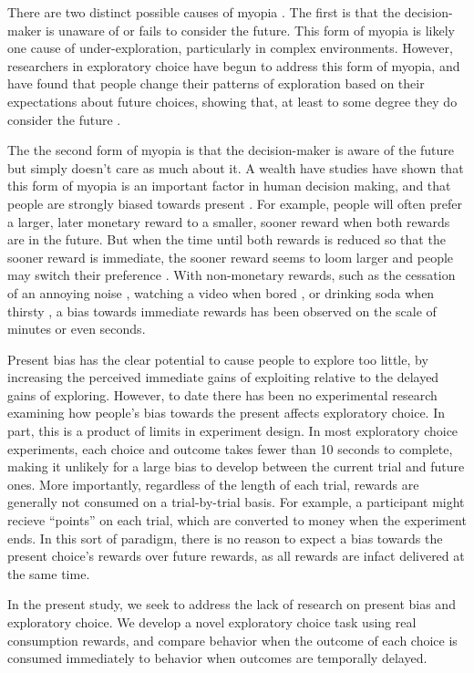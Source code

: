 \documentclass[10pt,letterpaper]{article}
\begin{document}
There are two distinct possible causes of myopia \citep{Bartels2015}. The first is that the decision-maker is
unaware of or fails to consider the future. This form of myopia is likely one
cause of under-exploration, particularly in complex environments. However,
researchers in exploratory choice have begun to address this form of myopia, and
have found that people change their
patterns of exploration based on their expectations about future choices,
showing that, at least to some degree they do consider the future \citep{Meyer1995, Wilson2014a, Rich2017}.

The the second form of myopia is that the decision-maker
is aware of the future but simply doesn't care as much about it.
A wealth have studies have shown that this form of myopia is an important factor
in human decision making, and that people are strongly
biased towards present . For example, people will often prefer a larger, later monetary
reward to a smaller, sooner reward when both rewards are in the future. But when the
time until both rewards is reduced so that the sooner reward is immediate, the
sooner reward seems to loom larger and
people may switch their preference \citep{Kirby1995}. With non-monetary rewards,
such as the cessation of an annoying noise \citep{Solnick1980}, watching a video
when bored \citep{Navarick1998}, or drinking soda
when thirsty \citep{Brown2009}, a bias towards immediate rewards has been observed on the scale of
minutes or even seconds.

Present bias has the clear potential to cause people to explore too little, by
increasing the perceived immediate gains of exploiting relative to the delayed
gains of exploring. However, to date there has been no experimental research
examining how people's bias towards the present affects exploratory choice. In
part, this is a product of limits in experiment design. In most exploratory
choice experiments, each choice and outcome takes fewer than 10 seconds to
complete, making it unlikely for a large bias to develop between the current
trial and future ones. More importantly, regardless of the length of each trial,
rewards are generally not consumed on a trial-by-trial basis. For example, a participant
might recieve ``points'' on each trial, which are converted to money when the
experiment ends. In this sort of paradigm, there is no reason to expect a bias
towards the present choice's rewards over future rewards, as all rewards are
infact delivered at the same time.

In the present study, we seek to address the lack of research on present bias
and exploratory choice. We develop a novel exploratory choice task using
real consumption rewards, and compare behavior when the outcome of each
choice is consumed immediately to behavior when outcomes are temporally delayed.
\end{document}
